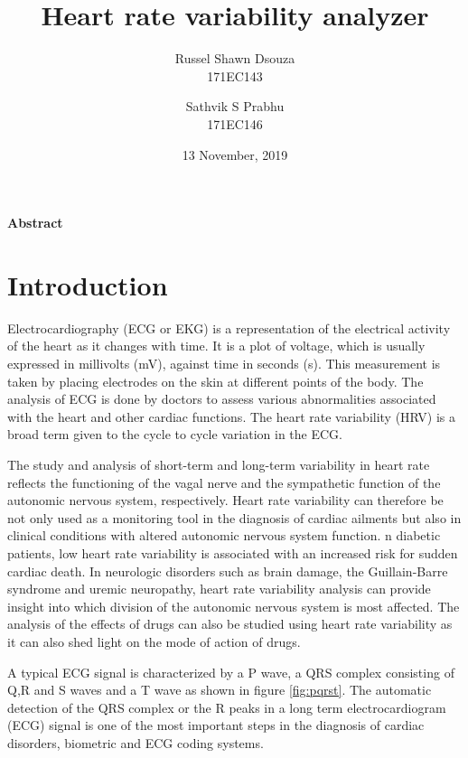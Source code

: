 \documentclass[11pt]{article}
\title{\textbf{Heart rate variability analyzer}}
\author{
  Russel Shawn Dsouza\\
  171EC143
  \and
  Sathvik S Prabhu\\
  171EC146
}
\date{13 November, 2019}
\theoremstyle{definition}
\begin{document}
  \maketitle
  \thispagestyle{empty}

  \newpage
  \tableofcontents
  \thispagestyle{empty}

  \setcounter{page}{1}
  \newpage
  \begin{center}
    \large{\textbf{Abstract}}
  \end{center}

  \section{Introduction}
  Electrocardiography (ECG or EKG) is a representation of the electrical activity of the heart as it changes with time. It is a plot of voltage, which is usually expressed in millivolts (mV), against time in seconds (s). This measurement is taken by placing electrodes on the skin at different points of the body. The analysis of ECG is done by doctors to assess various abnormalities associated with the heart and other cardiac functions. The heart rate variability (HRV) is a broad term given to the cycle to cycle variation in the ECG.

  The study and analysis of short-term and long-term variability in heart rate reflects the functioning of the vagal nerve and the sympathetic function of the autonomic nervous system, respectively.
  Heart rate variability can therefore be not only used as a monitoring tool in the diagnosis of cardiac ailments but also in clinical conditions with altered autonomic nervous system function.
  n diabetic patients, low heart rate variability is associated with an increased risk for sudden cardiac death.
  In neurologic disorders such as brain damage, the Guillain-Barre syndrome and uremic neuropathy, heart rate variability analysis can provide insight into which division of the autonomic nervous system is most affected.
  The analysis of the effects of drugs can also be studied using heart rate variability as it can also shed light on the mode of action of drugs.

  A typical ECG signal is characterized by a P wave, a QRS complex consisting of Q,R and S waves and a T wave as shown in figure \ref{fig:pqrst}.
  The automatic detection of the QRS complex or the R peaks in a long term electrocardiogram (ECG) signal is one of the most important steps in the diagnosis of cardiac disorders, biometric and ECG coding systems.
\end{document}
